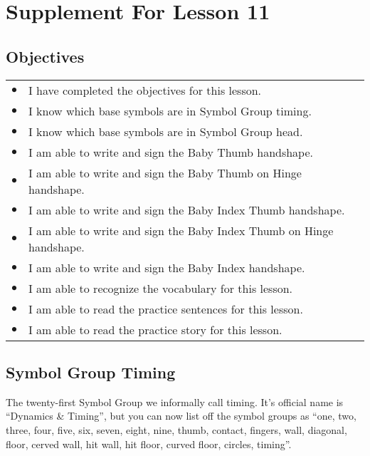 \documentclass{article}
\begin{document}
\newfontfamily{}
\newfontfamily{}
\newcommand{\bul}{\hfil$\bullet$&}
\renewenvironment{glossary}{\begin{multicols}{5}\begin{center}}{\end{center}\end{multicols}}
\setcounter{secnumdepth}{0}
\setlength{\columnseprule}{1pt}

\section{Supplement For Lesson 11}

\subsection{Objectives}

\begin{tabular}{p{1cm}p{14cm}}
\bul I have completed the objectives for this lesson.\\
\bul I know which base symbols are in Symbol Group timing.\\
\bul I know which base symbols are in Symbol Group head.\\
\bul I am able to write and sign the Baby Thumb handshape.\\
\bul I am able to write and sign the Baby Thumb on Hinge handshape.\\
\bul I am able to write and sign the Baby Index Thumb handshape.\\
\bul I am able to write and sign the Baby Index Thumb on Hinge handshape.\\
\bul I am able to write and sign the Baby Index handshape.\\
\bul I am able to recognize the vocabulary for this lesson.\\
\bul I am able to read the practice sentences for this lesson.\\
\bul I am able to read the practice story for this lesson.\\
\end{tabular}

\subsection{Symbol Group Timing}

The twenty-first Symbol Group we informally call timing.
It's official name is ``Dynamics \& Timing'', but you can now list off the symbol groups as ``one, two, three, four, five, six, seven, eight, nine, thumb, contact, fingers, wall, diagonal, floor, cerved wall, hit wall, hit floor, curved floor, circles, timing''.
\end{document}
